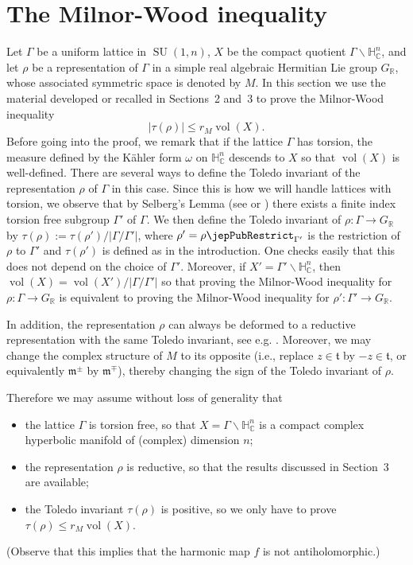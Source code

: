 \section{The Milnor-Wood inequality}
Let $\Gamma$ be a uniform lattice in $\operatorname{SU}(1,n)$, $X$ be the compact quotient $\Gamma\backslash\mathbb H^n_{\mathbb C}$, and let $\rho$ be a representation of $\Gamma$ in a simple real algebraic Hermitian Lie group $G_{\mathbb R}$, whose associated symmetric space is denoted by $M$. In this section we use the material developed or recalled in Sections~2 and~3 to prove the Milnor-Wood inequality
\[
|\tau(\rho)|\leqslant r_M\operatorname{vol}(X).
\]
Before going into the proof, we remark that if the lattice $\Gamma$ has torsion, the measure defined by the Kähler form $\omega$ on $\mathbb H^n_{\mathbb C}$ descends to $X$ so that $\operatorname{vol}(X)$ is well-defined. There are several ways to define the Toledo invariant of the representation $\rho$ of $\Gamma$ in this case. Since this is how we will handle lattices with torsion, we observe that by Selberg's Lemma (see \cite[p.~327]{jep93Rat06} or \cite{jep93Sel60}) there exists a finite index torsion free subgroup $\Gamma'$ of $\Gamma$. We then define the Toledo invariant of $\rho:\Gamma\to G_{\mathbb R}$ by $\tau(\rho):=\tau(\rho')/|\Gamma/\Gamma'|$, where $\rho'=\rho\jepPubRestrict_{\Gamma'}$ is the restriction of $\rho$ to $\Gamma'$ and $\tau(\rho')$ is defined as in the introduction. One checks easily that this does not depend on the choice of $\Gamma'$. Moreover, if $X'=\Gamma'\backslash\mathbb H^n_{\mathbb C}$, then $\operatorname{vol}(X)=\operatorname{vol}(X')/|\Gamma/\Gamma'|$ so that proving the Milnor-Wood inequality for $\rho:\Gamma\to G_{\mathbb R}$ is equivalent to proving the Milnor-Wood inequality for $\rho':\Gamma'\to G_{\mathbb R}$.

In addition, the representation $\rho$ can always be deformed to a reductive representation with the same Toledo invariant, see e.g. \cite[Lem.~4.11]{jep93KM17}. Moreover, we may change the complex structure of $M$ to its opposite (i.e., replace $z\in\mathfrak t$ by $-z\in\mathfrak t$, or equivalently $\mathfrak m^{\pm}$ by $\mathfrak m^{\mp}$), thereby changing the sign of the Toledo invariant of $\rho$.

Therefore we may assume without loss of generality that
\begin{itemize}
\item the lattice $\Gamma$ is torsion free, so that $X=\Gamma\backslash\mathbb H^n_{\mathbb C}$ is a compact complex hyperbolic manifold of (complex) dimension $n$;
\item the representation $\rho$ is reductive, so that the results discussed in Section~3 are available;
\item the Toledo invariant $\tau(\rho)$ is positive, so we only have to prove $\tau(\rho)\leqslant r_M\operatorname{vol}(X)$.
\end{itemize}
(Observe that this implies that the harmonic map $f$ is not antiholomorphic.)

